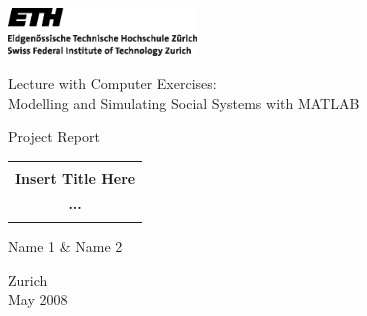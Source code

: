 
\thispagestyle{empty}

\begin{center}
\includegraphics[width=5cm]{ETHlogo.eps}

\bigskip


\bigskip


\bigskip


\LARGE{ 	Lecture with Computer Exercises:\\ }
\LARGE{ Modelling and Simulating Social Systems with MATLAB\\}

\bigskip

\bigskip

\small{Project Report}\\

\bigskip

\bigskip

\bigskip

\bigskip


\begin{tabular}{|c|}
\hline
\\
\textbf{\LARGE{Insert Title Here}}\\
\textbf{\LARGE{...}}\\
\\
\hline
\end{tabular}
\bigskip

\bigskip

\bigskip

\LARGE{Name 1 \& Name 2}



\bigskip

\bigskip

\bigskip

\bigskip

\bigskip

\bigskip

\bigskip

\bigskip

Zurich\\
May 2008\\

\end{center}


